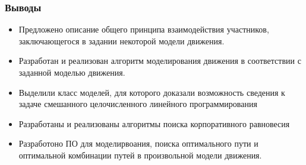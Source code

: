\documentclass{beamer}
\begin{document}
\begin{frame}\frametitle{Выводы}
	\begin{itemize}
		\item Предложено описание общего принципа взаимодействия участников, заключающегося в задании некоторой модели движения.
		\item Разработан и реализован алгоритм моделирования движения в соответствии с заданной моделью движения.
		\item Выделили класс моделей, для которого доказали возможность сведения к задаче смешанного целочисленного линейного программирования
		\item Разработаны и реализованы алгоритмы поиска корпоративного равновесия
		\item Разработоно ПО для моделирвоания, поиска оптимального пути и оптимальной комбинации путей в произвольной модели движения.
	\end{itemize}
\end{frame}
\end{document}
